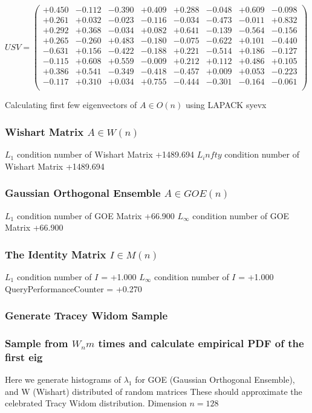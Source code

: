 \documentclass[9pt]{article}
\theoremstyle{plain}
\theoremstyle{definition}
\theoremstyle{remark}
\numberwithin{equation}{section}
\begin{document}
$U S V = \left(
\begin{array}{
cccccccc}
+0.450 & -0.112 & -0.390 & +0.409 & +0.288 & -0.048 & +0.609 & -0.098 \\
+0.261 & +0.032 & -0.023 & -0.116 & -0.034 & -0.473 & -0.011 & +0.832 \\
+0.292 & +0.368 & -0.034 & +0.082 & +0.641 & -0.139 & -0.564 & -0.156 \\
+0.265 & -0.260 & +0.483 & -0.180 & -0.075 & -0.622 & +0.101 & -0.440 \\
-0.631 & +0.156 & -0.422 & -0.188 & +0.221 & -0.514 & +0.186 & -0.127 \\
-0.115 & +0.608 & +0.559 & -0.009 & +0.212 & +0.112 & +0.486 & +0.105 \\
+0.386 & +0.541 & -0.349 & -0.418 & -0.457 & +0.009 & +0.053 & -0.223 \\
-0.117 & +0.310 & +0.034 & +0.755 & -0.444 & -0.301 & -0.164 & -0.061 \\
\end{array}
\right)$ \newline 

Calculating first few eigenvectors of $A \in O(n)$ using LAPACK syevx

\subsubsection{Wishart Matrix $A \in W(n)$}
$L_1$ condition number of Wishart Matrix +1489.694
$L_infty$ condition number of Wishart Matrix +1489.694
\subsubsection{Gaussian Orthogonal Ensemble $A \in GOE(n)$}
$L_1$ condition number of GOE Matrix +66.900
$L_\infty$ condition number of GOE Matrix +66.900
\subsubsection{The Identity Matrix $I \in M(n)$}
$L_1$ condition number of $I$ = +1.000
$L_\infty$ condition number of $I$ = +1.000
QueryPerformanceCounter  =  +0.270
\subsubsection{Generate Tracey Widom Sample}
\subsubsection{Sample from $W_n m$ times and calculate empirical PDF of the first eig}
Here we generate histograms of $\lambda_1$ for GOE (Gaussian Orthogonal Ensemble), and W (Wishart) 		 distributed of random matrices
These should approximate the celebrated Tracy Widom distribution.
Dimension $n = 128$
\end{document}
